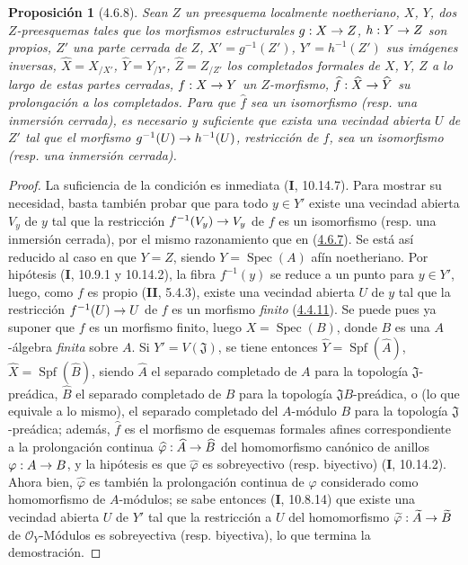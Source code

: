 \documentclass[10pt,oneside,openany]{book}
\theoremstyle{egaenv}\newtheorem*{env}{---}
\theoremstyle{egastatement}
\newtheorem*{proposition}{Proposición}
\theoremstyle{egadescription}
\renewcommand{\to}{\mathchoice{\longrightarrow}{\rightarrow}{\rightarrow}{\rightarrow}}
\begin{document}
\begin{proposition}[4.6.8]
\label{III.4.6.8-fr}
Sean $Z$ un preesquema localmente noetheriano, $X$, $Y$, dos $Z$-preesquemas
tales que los morfismos estructurales $g:X\to Z$, $h:Y\to Z$ son propios,
$Z'$ una parte cerrada de $Z$, $X'=g^{-1}(Z')$, $Y'=h^{-1}(Z')$ sus imágenes
inversas,
$\widehat X=X_{/X'}$, $\widehat Y=Y_{/Y'}$, $\widehat Z=Z_{/Z'}$
los completados formales de $X$, $Y$, $Z$ a lo largo de estas partes cerradas,
$f:X\to Y$ un $Z$-morfismo, $\widehat f:\widehat X\to\widehat Y$ su
prolongación a los completados. Para que $\widehat f$ sea un isomorfismo (\textup{resp.}
una inmersión cerrada), es necesario y suficiente que exista una vecindad abierta
$U$ de $Z'$ tal que el morfismo $g^{-1}(U)\to h^{-1}(U)$, restricción de
$f$, sea un isomorfismo (\textup{resp.} una inmersión cerrada).
\end{proposition}

\begin{proof}
La suficiencia de la condición es inmediata (\textbf{I}, 10.14.7). Para mostrar su
necesidad, basta también probar que para todo $y\in Y'$ existe una
vecindad abierta $V_y$ de $y$ tal que la restricción
$f^{-1}(V_y)\to V_y$ de $f$ es un isomorfismo (resp. una inmersión
cerrada), por el mismo razonamiento que en
(\hyperref[III.4.6.7-fr]{4.6.7}). Se está así reducido al caso en que $Y=Z$,
siendo $Y=\operatorname{Spec}(A)$ afín noetheriano. Por hipótesis
(\textbf{I}, 10.9.1 y 10.14.2), la fibra $f^{-1}(y)$ se reduce a un punto para
$y\in Y'$, luego, como $f$ es propio (\textbf{II}, 5.4.3), existe una vecindad
abierta $U$ de $y$ tal que la restricción $f^{-1}(U)\to U$ de $f$ es un
morfismo \emph{finito} (\hyperref[III.4.4.11-fr]{4.4.11}). Se puede pues ya suponer
que $f$ es un morfismo finito, luego $X=\operatorname{Spec}(B)$, donde $B$ es
una $A$-álgebra \emph{finita} sobre $A$. Si $Y'=V(\mathfrak J)$, se tiene entonces
$\widehat Y=\operatorname{Spf}(\widehat A)$, $\widehat X=\operatorname{Spf}(\widehat B)$,
siendo $\widehat A$ el separado completado de $A$ para la topología
$\mathfrak J$-preádica, $\widehat B$ el separado completado de $B$ para la
topología $\mathfrak JB$-preádica, o (lo que equivale a lo mismo), el separado
completado del $A$-módulo $B$ para la topología $\mathfrak J$-preádica;
además, $\widehat f$ es el morfismo de esquemas formales afines correspondiente
a la prolongación continua $\widehat\varphi:\widehat A\to\widehat B$ del
homomorfismo canónico de anillos $\varphi:A\to B$, y la hipótesis es que
$\widehat\varphi$ es sobreyectivo (resp. biyectivo) (\textbf{I}, 10.14.2). Ahora bien,
$\widehat\varphi$ es también la prolongación continua de $\varphi$ considerado
como homomorfismo de $A$-módulos; se sabe entonces (\textbf{I}, 10.8.14) que existe
una vecindad abierta $U$ de $Y'$ tal que la restricción a $U$ del
homomorfismo $\widetilde\varphi:\widetilde A\to\widetilde B$ de
$\mathcal O_Y$-Módulos es sobreyectiva (resp. biyectiva), lo que termina la
demostración.
\end{proof}
\end{document}
